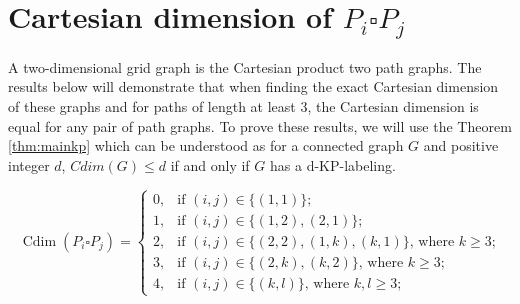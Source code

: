 \documentclass[12pt,a4paper,titlepage,openany]{report}
\DeclareMathOperator{\Cdim}{Cdim}
\begin{document}
\section{Cartesian dimension of $P_i\square P_j$}
A two-dimensional grid graph is the Cartesian product two path graphs. The results below will demonstrate that when finding the exact Cartesian dimension of these graphs and for paths of length at least 3, the Cartesian dimension is equal for any pair of path graphs. To prove these results, we will use the Theorem \ref{thm:mainkp} which can be understood as for a connected graph $G$ and positive integer $d$, $Cdim(G) \leq d$ if and only if $G$ has a d-KP-labeling.\newline
\begin{theorem}
\[
	\Cdim(P_i \square P_j ) =
		\left\{
			\begin{array}{ll}
				0, & \text{if $(i,j)\in \{(1,1)\}$;} \\
				1, & \text{if $(i,j)\in \{(1,2),(2,1)\}$;} \\
				2, & \text{if $(i,j)\in \{(2,2), (1,k),(k,1)\}$, where $k\geq 3$;} \\
				3, & \text{if $(i,j)\in \{(2,k),(k,2)\}$, where $k\geq 3$;} \\
				4, & \text{if $(i,j)\in \{(k,l)\}$, where $k,l\geq 3$;}
			\end{array}
		\right.
\]
\end{theorem}
\end{document}
